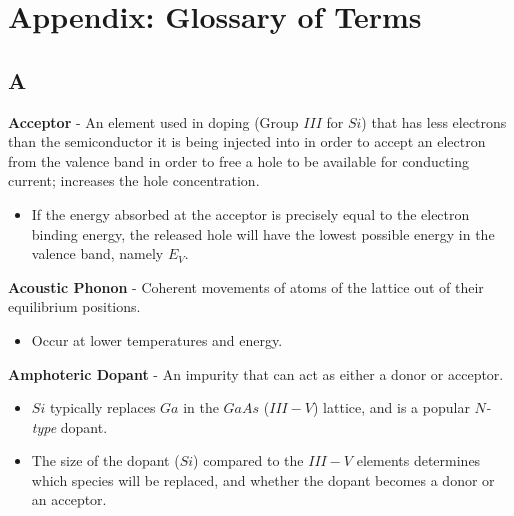 \chapter{Appendix: Glossary of Terms}
\label{app:glossary}
\section{A}
    \textbf{Acceptor} - An element used in doping (Group $III$ for $Si$) that has less electrons than the semiconductor it is being injected into in order to accept an electron from the valence band in order to free a hole to be available for conducting current; increases the hole concentration.
    \vspace{0.15cm}
    \begin{itemize}
        \setlength\itemsep{0.5em}
        \item{If the energy absorbed at the acceptor is precisely equal to the electron binding energy, the released hole will have the lowest possible energy in the valence band, namely $E_V$.}
    \end{itemize}
\vspace{0.5cm}
    \textbf{Acoustic Phonon} - Coherent movements of atoms of the lattice out of their equilibrium positions.
    \vspace{0.15cm}
    \begin{itemize}
        \setlength\itemsep{0.5em}
        \item{Occur at lower temperatures and energy.}
    \end{itemize}
\vspace{0.5cm}
    \textbf{Amphoteric Dopant} - An impurity that can act as either a donor or acceptor.
    \vspace{0.15cm}
    \begin{itemize}
        \setlength\itemsep{0.5em}
        \item{$Si$ typically replaces $Ga$ in the $GaAs$ ($III-V$) lattice, and is a popular $N$\emph{-type} dopant.}
        \item{The size of the dopant ($Si$) compared to the $III-V$ elements determines which species will be replaced, and whether the dopant becomes a donor or an acceptor.}
    \end{itemize}
